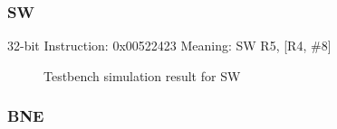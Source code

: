 \subsubsection*{SW}
\label{sect6_4_3_2e}

32-bit Instruction: 0x00522423 \newline
Meaning: SW R5, [R4, \#8]

\begin{figure}[h!]
\centering
\caption{Testbench simulation result for SW}
\label{fig:riscv13}
\end{figure}

\subsubsection*{BNE}
\label{sect6_4_3_2f}





